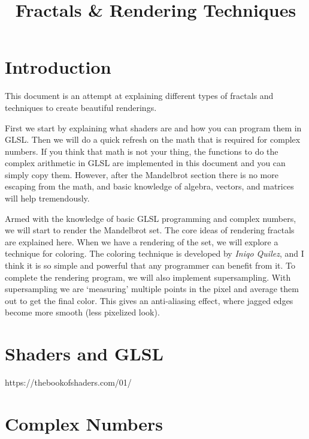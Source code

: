 \documentclass[11pt]{article}
\title{Fractals \& Rendering Techniques}
\begin{document}
    	
    
    
    \maketitle
    \newpage
    \tableofcontents
    \newpage
    

    
    \hypertarget{introduction}{%
\section{Introduction}\label{introduction}}

    This document is an attempt at explaining different types of fractals
and techniques to create beautiful renderings.

First we start by explaining what shaders are and how you can program
them in GLSL. Then we will do a quick refresh on the math that is
required for complex numbers. If you think that math is not your thing,
the functions to do the complex arithmetic in GLSL are implemented in
this document and you can simply copy them. However, after the
Mandelbrot section there is no more escaping from the math, and basic
knowledge of algebra, vectors, and matrices will help tremendously.

Armed with the knowledge of basic GLSL programming and complex numbers,
we will start to render the Mandelbrot set. The core ideas of rendering
fractals are explained here. When we have a rendering of the set, we
will explore a technique for coloring. The coloring technique is
developed by \emph{Iniqo Quilez}, and I think it is so simple and
powerful that any programmer can benefit from it. To complete the
rendering program, we will also implement supersampling. With
supersampling we are `measuring' multiple points in the pixel and
average them out to get the final color. This gives an anti-aliasing
effect, where jagged edges become more smooth (less pixelized look).

    \hypertarget{shaders-and-glsl}{%
\section{Shaders and GLSL}\label{shaders-and-glsl}}

    https://thebookofshaders.com/01/

    \hypertarget{complex-numbers}{%
\section{Complex Numbers}\label{complex-numbers}}
\end{document}
